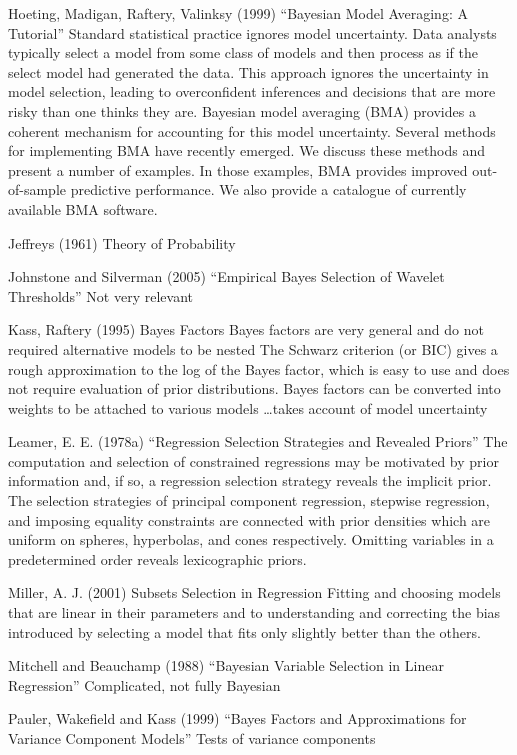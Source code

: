 \documentclass{amsart}[12pt]
\begin{document}
Hoeting, Madigan, Raftery, Valinksy (1999) ``Bayesian Model Averaging: A Tutorial''
Standard statistical practice ignores model uncertainty. Data analysts typically select a model from some class
of models and then process as if the select model had generated the data. This approach ignores the uncertainty
in model selection, leading to overconfident inferences and decisions that are more risky than one thinks they
are. Bayesian model averaging (BMA) provides a coherent mechanism for accounting for this model uncertainty.
Several methods for implementing BMA have recently emerged. We discuss these methods and present a number of
examples. In those examples, BMA provides improved out-of-sample predictive performance. We also provide a
catalogue of currently available BMA software.

Jeffreys (1961) Theory of Probability

Johnstone and Silverman (2005) ``Empirical Bayes Selection of Wavelet Thresholds''
Not very relevant

Kass, Raftery (1995) Bayes Factors
Bayes factors are very general and do not required alternative models to be nested
The Schwarz criterion (or BIC) gives a rough approximation to the log of the Bayes factor, which is easy
to use and does not require evaluation of prior distributions.
Bayes factors can be converted into weights to be attached to various models \ldots takes account of model
uncertainty

Leamer, E. E. (1978a) ``Regression Selection Strategies and Revealed Priors''
The computation and selection of constrained regressions may be motivated by prior information and, if so,
a regression selection strategy reveals the implicit prior. The selection strategies of principal component
regression, stepwise regression, and imposing equality constraints are connected with prior densities which are
uniform on spheres, hyperbolas, and cones respectively. Omitting variables in a predetermined order reveals
lexicographic priors.

Miller, A. J. (2001) Subsets Selection in Regression
Fitting and choosing models that are linear in their parameters and to understanding and correcting the bias
introduced by selecting a model that fits only slightly better than the others.

Mitchell and Beauchamp (1988) ``Bayesian Variable Selection in Linear Regression''
Complicated, not fully Bayesian

Pauler, Wakefield and Kass (1999) ``Bayes Factors and Approximations for Variance Component Models''
Tests of variance components
\end{document}
